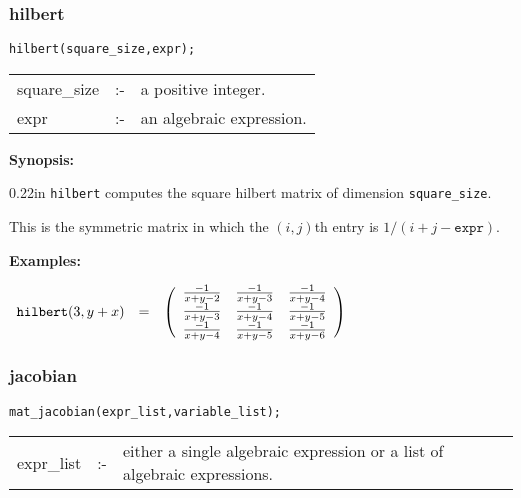\subsubsection{hilbert}
\label{linalg:hilbert}

\hspace*{0.175in} {\tt hilbert(square\_size,expr);}

\hspace*{0.1in} 
\begin{tabular}{l l l}
square\_size &:-& a positive integer. \\
expr         &:-& an algebraic expression.
\end{tabular}

{\bf Synopsis:} %

\begin{addtolength}{\leftskip}{0.22in}
{\tt hilbert} computes the square hilbert matrix of 
                dimension \texttt{square\_size}. 

This is the symmetric matrix in which the $(i,j)$th entry is
$1/(i+j-\texttt{expr})$.

\end{addtolength}

{\bf Examples:}

\begin{flushleft}  
\hspace*{0.1in}
\begin{math}        
\begin{array}{ccc}
{\tt hilbert}(3,y+x) & = & 
\left( \begin{array}{ccc} \frac{-1}{x+y-2} & \frac{-1}{x+y-3} 
& \frac{-1}{x+y-4} \\ \frac{-1}{x+y-3} & \frac{-1}{x+y-4} & 
\frac{-1}{x+y-5} \\ \frac{-1}{x+y-4} & \frac{-1}{x+y-5} & 
\frac{-1}{x+y-6} 
\end{array} \right)
\end{array}
\end{math}  
\end{flushleft}


\subsubsection{jacobian}
\label{linalg:mat_jacobian}

\hspace*{0.175in} {\tt mat\_jacobian(expr\_list,variable\_list);}

\hspace*{0.1in} 
\begin{tabular}{l l l}
expr\_list   \hspace*{0.175in}  &:-& \parbox[t]{.72\linewidth}{either a 
single algebraic expression or a list of algebraic expressions.} 
\end{tabular}

